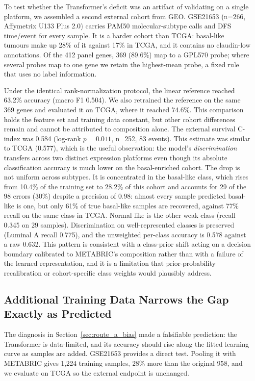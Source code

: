 \documentclass[11pt,a4paper]{article}
\begin{document}
To test whether the Transformer's deficit was an artifact of validating on a single platform,
we assembled a second external cohort from GEO. GSE21653 (n=266, Affymetrix U133 Plus 2.0)
carries PAM50 molecular-subtype calls and DFS time/event for every sample. It is a harder
cohort than TCGA: basal-like tumours make up 28\% of it against 17\% in TCGA, and it contains
no claudin-low annotations. Of the 412 panel genes, 369 (89.6\%) map to a GPL570 probe; where
several probes map to one gene we retain the highest-mean probe, a fixed rule that uses no
label information.

Under the identical rank-normalization protocol, the linear reference reached 63.2\% accuracy
(macro F1 0.504). We also retrained the reference on the same 369 genes and evaluated it on
TCGA, where it reached 74.6\%. This comparison holds the feature set and training data
constant, but other cohort differences remain and cannot be attributed to composition alone.
The external survival C-index was 0.584 (log-rank $p=0.011$, n=252, 83 events). This estimate
was similar to TCGA (0.577), which is the useful
observation: the model's \emph{discrimination} transfers across two distinct expression
platforms even though its absolute classification accuracy is much lower on the
basal-enriched cohort. The drop is not uniform across subtypes. It is concentrated in the basal-like class, which
rises from 10.4\% of the training set to 28.2\% of this cohort and accounts for 29 of the 98
errors (30\%) despite a precision of 0.98: almost every sample predicted basal-like is one,
but only 61\% of true basal-like samples are recovered, against 77\% recall on the same class
in TCGA. Normal-like is the other weak class (recall 0.345 on 29 samples). Discrimination on
well-represented classes is preserved (Luminal A recall 0.775), and the unweighted per-class
accuracy is 0.578 against a raw 0.632. This pattern is consistent with a class-prior shift
acting on a decision boundary calibrated to METABRIC's composition rather than with a failure
of the learned representation, and it is a limitation that prior-probability recalibration or
cohort-specific class weights would plausibly address.

\subsection{Additional Training Data Narrows the Gap Exactly as Predicted}
\label{sec:route_a_multicohort}

The diagnosis in Section~\ref{sec:route_a_bias} made a falsifiable prediction: the Transformer
is data-limited, and its accuracy should rise along the fitted learning curve as samples are
added. GSE21653 provides a direct test. Pooling it with METABRIC gives 1{,}224 training samples,
28\% more than the original 958, and we evaluate on TCGA so the external endpoint is unchanged.
\end{document}
